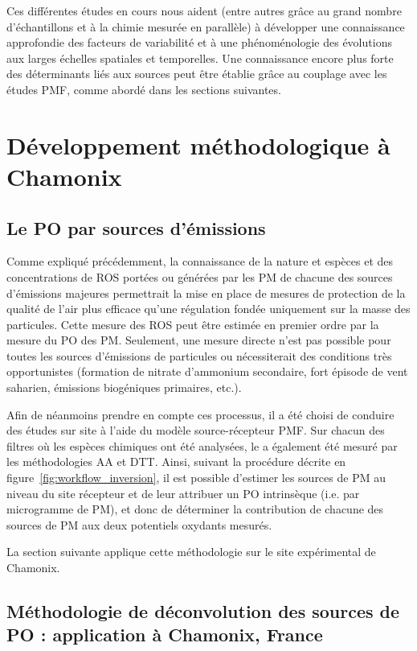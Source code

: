 Ces différentes études en cours nous aident (entre autres grâce au grand nombre
d'échantillons et à la chimie mesurée en parallèle) à développer une connaissance
approfondie des facteurs de variabilité et à une phénoménologie des évolutions aux larges
échelles spatiales et temporelles. Une connaissance encore plus forte des déterminants
liés aux sources peut être établie grâce au couplage avec les études PMF, comme abordé
dans les sections suivantes.

\clearpage
\section{Développement méthodologique à Chamonix}%
\label{ssub:développement_méthodologique_à_chamonix}

\subsection{Le PO par sources d'émissions}%
\label{sub:le_po_par_sources_d_émission}

Comme expliqué précédemment, la connaissance de la nature et espèces et des concentrations
de ROS portées ou générées par les PM de chacune des sources d'émissions majeures
permettrait la mise en place de mesures de protection de la qualité de l'air plus efficace
qu'une régulation fondée uniquement sur la masse des particules.  Cette mesure des ROS
peut être estimée en premier ordre par la mesure du PO des PM.  Seulement, une mesure
directe n'est pas possible pour toutes les sources d'émissions de particules ou
nécessiterait des conditions très opportunistes (formation de nitrate d'ammonium
secondaire, fort épisode de vent saharien, émissions biogéniques primaires, etc.).

Afin de néanmoins prendre en compte ces processus, il a été choisi de conduire des études
sur site à l'aide du modèle source-récepteur PMF. Sur chacun des filtres où les espèces
chimiques ont été analysées, le \POv{} a également été mesuré par les méthodologies AA et DTT. Ainsi, suivant
la procédure décrite en figure~\ref{fig:workflow_inversion}, il est possible d'estimer les
sources de PM au niveau du site récepteur et de leur attribuer un PO intrinsèque (i.e. par
microgramme de PM), et donc de déterminer la contribution de chacune des sources de PM aux
deux potentiels oxydants mesurés.

La section suivante applique cette méthodologie sur le site expérimental de Chamonix.

\subsection{Méthodologie de déconvolution des sources de PO : application à Chamonix,
    France}
\label{sec:weber_et_al_2018}

